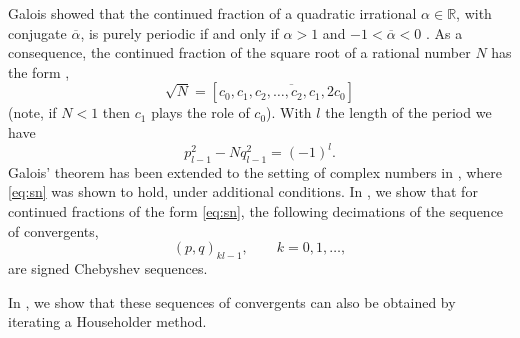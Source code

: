 \documentclass[a4paper,fleqn]{cas-sc}
\def\R{\mathbb{R}}
\begin{document}
Galois showed that the continued fraction of a quadratic irrational $\alpha\in\R$, with conjugate $\overline{\alpha}$, is purely periodic if and only if $\alpha>1$ and $-1<\overline{\alpha}<0$ \cite[Theorems 4.1 and 4.2]{Olds}. As a consequence, the continued fraction of the square root of a rational number $N$ has the form \cite[Section 4.7]{Olds}, 
\begin{equation} \label{eq:sn}
\sqrt{N}=[c_0,\overline{c_1,c_2,\ldots,c_{2},c_{1},2c_0}]
\end{equation}
(note, if $N<1$ then $c_1$ plays the role of $c_0$). With $l$ the length of the period we have \cite[Equation (4.41)]{Olds}
\begin{equation} \label{eq:Pll}
p_{l-1}^2-Nq_{l-1}^2=(-1)^l.
\end{equation}
Galois' theorem has been extended to the setting of complex numbers in \cite{GGR}, where \eqref{eq:sn} was shown to hold, under additional conditions. In , we show that for continued fractions of the form \eqref{eq:sn}, the following decimations of the sequence of convergents,
\[
(p,q)_{kl-1}, \qquad k=0,1,\ldots,
\]
are signed Chebyshev sequences.

In , we show that these sequences of convergents can also be obtained by iterating a Householder method. %
\end{document}
